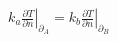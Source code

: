 \begin{gather*}
\left.k_a\frac{\partial T}{\partial n}\right|_{\partial_{A}} = \left.k_b\frac{\partial T}{\partial n}\right|_{\partial_B}
\end{gather*}

%

